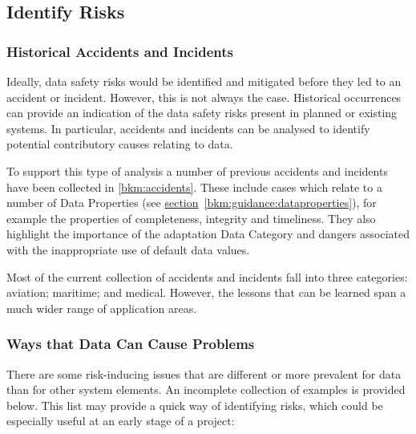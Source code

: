 \subsection{Identify Risks}
\subsubsection{Historical Accidents and Incidents}
Ideally, data safety risks would be identified and mitigated before they led to an accident or incident. However, this is not always the case. Historical occurrences can provide an indication of the data safety risks present in planned or existing systems. In particular, accidents and incidents can be analysed to identify potential contributory causes relating to data.

To support this type of analysis a number of previous accidents and incidents have been collected in \autoref{bkm:accidents}.
These include cases which relate to a number of Data Properties (see
\hyperref[bkm:guidance:dataproperties]{section}~\ref{bkm:guidance:dataproperties}), %
for example the properties of completeness, integrity and timeliness.
They also highlight the importance of the adaptation Data Category and dangers associated with the inappropriate use of default data values.

Most of the current collection of accidents and incidents fall into three categories: aviation; maritime; and medical. However, the lessons that can be learned span a much wider range of application areas.

\subsubsection{Ways that Data Can Cause Problems}
\label{tab:issues}
There are some risk-inducing issues that are different or more prevalent for data than for other system elements. An incomplete collection of examples is provided below. This list may provide a quick way of identifying risks, which could be especially useful at an early stage of a project:

